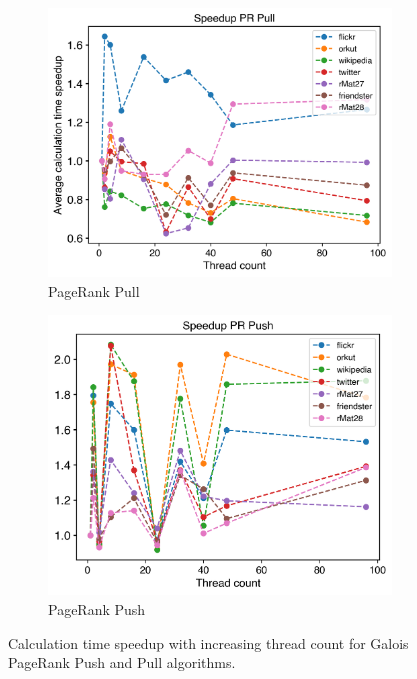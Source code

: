 \begin{figure}
	\begin{subfigure}{\columnwidth}
		\includegraphics[width=\linewidth]{../../plots/singleNodePRPullGaloisThreads.png}
		\caption{PageRank Pull}
		\label{fig:galoisSpeedupPRPull}
	\end{subfigure}
	\begin{subfigure}{\columnwidth}
		\includegraphics[width=\linewidth]{../../plots/singleNodePRPushGaloisThreads.png}
		\caption{PageRank Push}
		\label{fig:galoisSpeedupPRPush}
	\end{subfigure}
	\caption{Calculation time speedup with increasing thread count for Galois PageRank Push and Pull algorithms.}
\end{figure}


